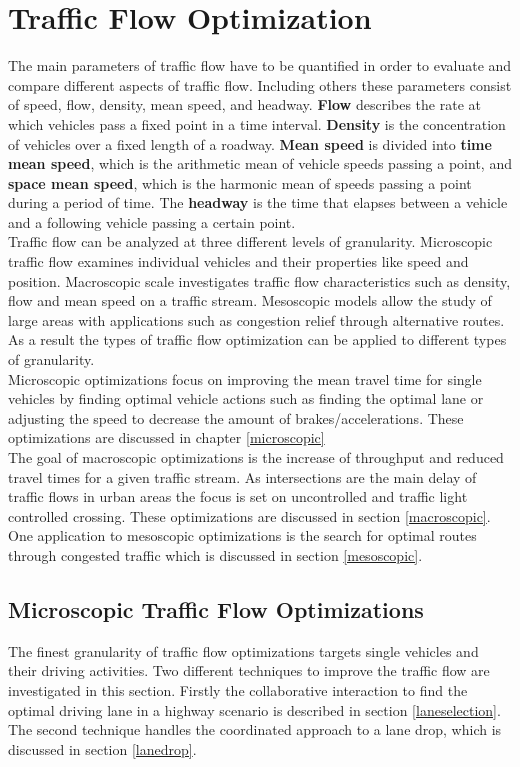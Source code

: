 \documentclass{sig-alternate}
\begin{document}
\section{Traffic Flow Optimization }
The main parameters of traffic flow have to be quantified in order to evaluate and compare different aspects of traffic flow. Including others these parameters consist of speed, flow, density, mean speed, and headway. \textbf{Flow} describes the rate at which vehicles pass a fixed point in a time interval. \textbf{Density} is the concentration of vehicles over a fixed length of a roadway. \textbf{Mean speed} is divided into \textbf{time mean speed}, which is the arithmetic mean of vehicle speeds passing a point, and \textbf{space mean speed}, which is the harmonic mean of speeds passing a point during a period of time. The \textbf{headway} is the time that elapses between a vehicle and a following vehicle passing a certain point. \\
Traffic flow can be analyzed at three different levels of granularity. Microscopic traffic flow examines individual vehicles and their properties like speed and position. Macroscopic scale investigates traffic flow characteristics such as density, flow and mean speed on a traffic stream. Mesoscopic models allow the study of large areas with applications such as congestion relief through alternative routes. \\
As a result the types of traffic flow optimization can be applied to different types of granularity. \\
Microscopic optimizations focus on improving the mean travel time for single vehicles by finding optimal vehicle actions such as finding the optimal lane or adjusting the speed to decrease the amount of brakes/accelerations. These optimizations are discussed in chapter \ref{microscopic}\\
The goal of macroscopic optimizations is the increase of throughput and reduced travel times for a given traffic stream. As intersections are the main delay of traffic flows in urban areas the focus is set on uncontrolled and traffic light controlled crossing. These optimizations are discussed in section \ref{macroscopic}.\\
One application to mesoscopic optimizations is the search for optimal routes through congested traffic which is discussed in section \ref{mesoscopic}.

\subsection{Microscopic Traffic Flow Optimizations}
The finest granularity of traffic flow optimizations targets single vehicles and their driving activities. Two different techniques to improve the traffic flow are investigated in this section. Firstly the collaborative interaction to find the optimal driving lane in a highway scenario is described in section \ref{laneselection}. The second technique handles the coordinated approach to a lane drop, which is discussed in section \ref{lanedrop}.
\label{microscopic}
\end{document}
